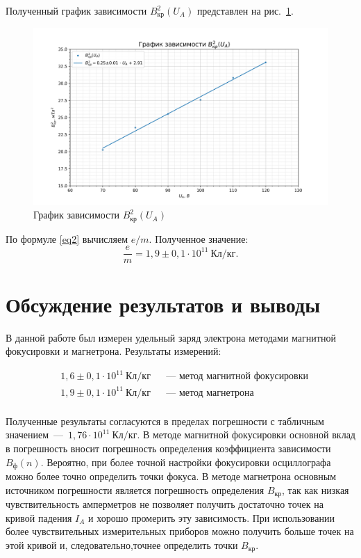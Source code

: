 \documentclass[a4paper, 12pt]{article}
\begin{document}
Полученный график зависимости $B^2_{кр}(U_A)$ представлен на рис.~\ref{ris6}.

\vspace{10cm}

\begin{figure}[h!]
\begin{flushleft}
    \includegraphics[scale=0.7]{3.3.1_4.png}
\end{flushleft}
\caption{График зависимости $B^2_{кр}(U_A)$}
\label{ris6}
\end{figure}

По формуле \eqref{eq2} вычисляем $e/m$. Полученное значение: $$\frac{e}{m} = 1,9\pm0,1\cdot 10^{11}~Кл/кг.$$

\section{Обсуждение результатов и выводы}

В данной работе был измерен удельный заряд электрона методами магнитной фокусировки и магнетрона. Результаты измерений:

$$\boxed{\begin{aligned}
&1,6\pm0,1\cdot 10^{11}~Кл/кг && \text{--- метод магнитной фокусировки} \\
&1,9\pm0,1\cdot 10^{11}~Кл/кг && \text{--- метод магнетрона} \\
\end{aligned}}$$

Полученные результаты согласуются в пределах погрешности с табличным значением~---~$1,76 \cdot 10^{11}~Кл/кг$. В методе магнитной фокусировки основной вклад в погрешность вносит погрешность определения коэффициента зависимости $B_ф(n)$. Вероятно, при более точной настройки фокусировки осциллографа можно более точно определить точки фокуса. В методе магнетрона основным источником погрешности является погрешность определения $B_{кр}$, так как низкая чувствительность амперметров не позволяет получить достаточно точек на кривой падения $I_A$ и хорошо промерить эту зависимость. При использовании более чувствительных измерительных приборов можно получить больше точек на этой кривой и, следовательно,точнее определить точки $B_{кр}$.
\end{document}
